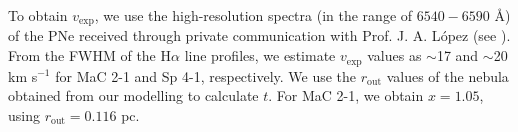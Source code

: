 \documentclass[a4paper,fleqn,usenatbib]{mnras}
\begin{document}
To obtain $v_\mathrm{exp}$, we use the high-resolution spectra (in the range of $6540-6590$ {\AA}) of the PNe received through private communication with Prof. J. A. L{\'o}pez (see \citet{SPMCatalog}). From the FWHM of the H$\alpha$ line profiles, we estimate $v_\mathrm{exp}$ values as $\sim$17 and $\sim$20 km s$^{-1}$ for MaC 2-1 and Sp 4-1, respectively. We use the $r_\mathrm{out}$ values of the nebula obtained from our modelling to calculate $t$. For MaC 2-1, we obtain $x=1.05$, using $r_\mathrm{out}=0.116$ pc.                                                                                                                                                                                                                                                                                                                                                                                                                                                                                                                                                                                                                                                                                                                                                                                                                                                                                                                                                                                                                                                                                                                                                                                                                                                                                                                                                                                                                                                                                                                                                                                                                                                                                                                                                                                                                                                                                                                                                                                                                                                                                                                                                                                                                                                                                                                                                                                                                                                                                                                                                                                                                                                                                                                                                                                                                                                                                                                                 
\end{document}
